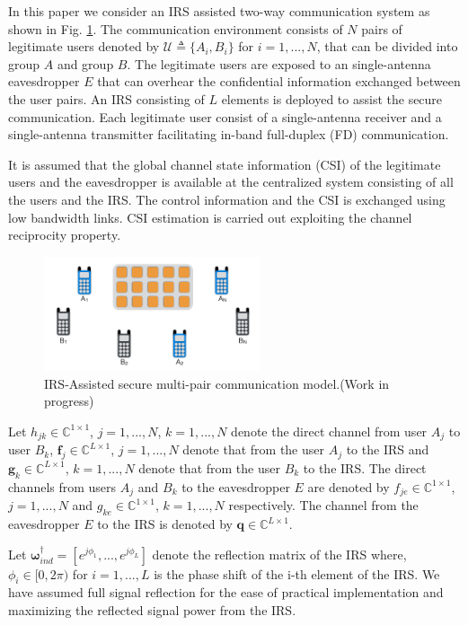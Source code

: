\documentclass[lettersize,journal]{IEEEtran}
\begin{document}
In this paper we consider an IRS assisted two-way communication system as shown in Fig. \ref{fig_system}. The communication environment consists of $N$ pairs of legitimate users denoted by $\mathcal{U} \triangleq \{A_i, B_i\}$ for $i = 1,...,N$, that can be divided into group $A$ and group $B$. The legitimate users are exposed to an single-antenna eavesdropper $E$ that can overhear the confidential information exchanged between the user pairs. An IRS consisting of $L$ elements is deployed to assist the secure communication. Each legitimate user consist of a single-antenna receiver and a single-antenna transmitter facilitating in-band full-duplex (FD) communication. 

It is assumed that the global channel state information (CSI) of the legitimate users and the eavesdropper is available at the centralized system consisting of all the users and the IRS. The control information and the CSI is exchanged using low bandwidth links. CSI estimation is carried out exploiting the channel reciprocity property.

\begin{figure}[!t]
\centering
\includegraphics[width=2.5in]{images/test}
\caption{IRS-Assisted secure multi-pair communication model.(Work in progress)}
\label{fig_system}
\end{figure}


Let $h_{jk} \in \mathbb{C}^{1\times1}$, $j = 1,...,N$, $k = 1,...,N$ denote the direct channel from user $A_j$ to user $B_k$, $\boldsymbol{f}_j \in \mathbb{C}^{L\times1}$, $j = 1,...,N$ denote that from the user $A_j$ to the IRS and $\boldsymbol{g}_k \in \mathbb{C}^{L\times1}$, $k = 1,...,N$ denote that from the user $B_k$ to the IRS. The direct channels from users $A_j$ and $B_k$ to the eavesdropper $E$ are denoted by $f_{je} \in \mathbb{C}^{1\times1}$, $j = 1,...,N$ and $g_{ke} \in \mathbb{C}^{1\times1}$, $k = 1,...,N$ respectively. The channel from the eavesdropper $E$ to the IRS is denoted by $\boldsymbol{q} \in \mathbb{C}^{L\times1}$.

Let $\boldsymbol{\omega}_{ind}^\dag = [e^{j\phi_{1}},...,e^{j\phi_{L}}]$ denote the reflection matrix of the IRS where, $\phi_{i} \in [0,2 \pi)$ for $i = 1,...,L$ is the phase shift of the i-th element of the IRS. We have assumed full signal reflection for the ease of practical implementation and maximizing the reflected signal power from the IRS.
\end{document}
